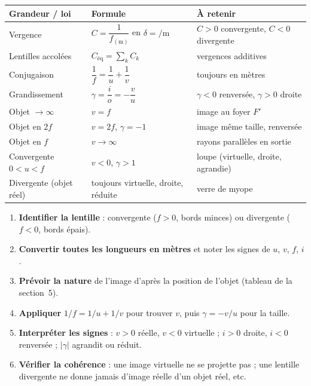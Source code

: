 \documentclass[11pt,a4paper]{article}
\newcommand{\gamm}{\gamma}             %
\begin{document}
\begin{center}
\renewcommand{\arraystretch}{1.5}
\begin{tabular}{>{\raggedright\arraybackslash}p{4.5cm} >{\centering\arraybackslash}p{5.4cm} >{\raggedright\arraybackslash}p{4.5cm}}
\rowcolor{primary!18}
\textbf{Grandeur / loi} & \textbf{Formule} & \textbf{À retenir} \\
\midrule
Vergence & $C=\dfrac{1}{f_{(\mathrm{m})}}$ en $\delta=\si{\per\metre}$ & $C>0$ convergente, $C<0$ divergente \\
Lentilles accolées & $C_{\text{éq}}=\sum_k C_k$ & vergences additives \\
Conjugaison & $\dfrac{1}{f}=\dfrac{1}{u}+\dfrac{1}{v}$ & toujours en mètres \\
Grandissement & $\gamm=\dfrac{i}{o}=-\dfrac{v}{u}$ & $\gamm<0$ renversée, $\gamm>0$ droite \\
Objet $\to\infty$ & $v=f$ & image au foyer $F'$ \\
Objet en $2f$ & $v=2f$, $\gamm=-1$ & image même taille, renversée \\
Objet en $f$ & $v\to\infty$ & rayons parallèles en sortie \\
Convergente $0<u<f$ & $v<0$, $\gamm>1$ & loupe (virtuelle, droite, agrandie) \\
Divergente (objet réel) & toujours virtuelle, droite, réduite & verre de myope \\
\bottomrule
\end{tabular}
\end{center}

\begin{methode}
\begin{enumerate}[leftmargin=1.8em,topsep=2pt,itemsep=1pt]
  \item \textbf{Identifier la lentille} : convergente ($f>0$, bords minces) ou divergente ($f<0$, bords épais).
  \item \textbf{Convertir toutes les longueurs en mètres} et noter les signes de $u$, $v$, $f$, $i$.
  \item \textbf{Prévoir la nature} de l'image d'après la position de l'objet (tableau de la section~5).
  \item \textbf{Appliquer} $1/f=1/u+1/v$ pour trouver $v$, puis $\gamm=-v/u$ pour la taille.
  \item \textbf{Interpréter les signes} : $v>0$ réelle, $v<0$ virtuelle ; $i>0$ droite, $i<0$ renversée ;
        $|\gamm|$ agrandit ou réduit.
  \item \textbf{Vérifier la cohérence} : une image virtuelle ne se projette pas ; une lentille divergente
        ne donne jamais d'image réelle d'un objet réel, etc.
\end{enumerate}
\end{methode}
\end{document}
